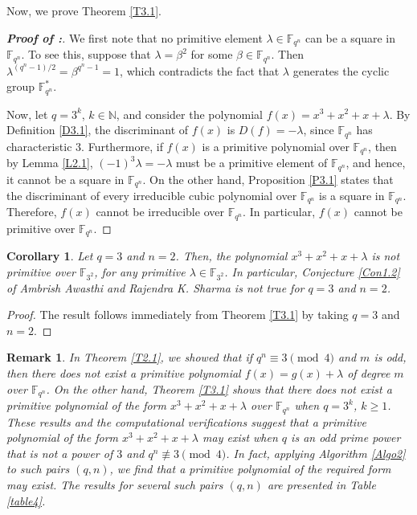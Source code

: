 \documentclass[preprint,12pt]{elsarticle}
\newtheorem{cor}{Corollary}[section]
\newtheorem{rk}{Remark}[section]
\begin{document}
     Now, we prove Theorem \ref{T3.1}.
    \begin{proof}[\textbf{Proof of :}]
        We first note that no primitive element $\lambda\in\mathbb{F}_{q^n}$ can be a square in $\mathbb{F}_{q^n}$. To see this, suppose that $\lambda=\beta^2$ for some $\beta\in\mathbb{F}_{q^n}$. Then $\lambda^{(q^n-1)/2}=\beta^{q^n-1}=1$, which contradicts the fact that $\lambda$ generates the cyclic group $\mathbb{F}_{q^n}^{*}$.

        Now, let $q=3^k$, $k\in\mathbb{N}$, and consider the polynomial $f(x)=x^3+x^2+x+\lambda$. By Definition \ref{D3.1}, the discriminant of $f(x)$ is $D(f)=-\lambda$, since $\mathbb{F}_{q^n}$ has characteristic $3$. Furthermore, if $f(x)$ is a primitive polynomial over $\mathbb{F}_{q^n}$, then by Lemma \ref{L2.1}, $(-1)^3\lambda=-\lambda$ must be a primitive element of $\mathbb{F}_{q^n}$, and hence, it cannot be a square in $\mathbb{F}_{q^n}$. On the other hand, Proposition \ref{P3.1} states that the discriminant of every irreducible cubic polynomial over $\mathbb{F}_{q^n}$ is a square in $\mathbb{F}_{q^n}$. Therefore, $f(x)$ cannot be irreducible over $\mathbb{F}_{q^n}$. In particular, $f(x)$ cannot be primitive over $\mathbb{F}_{q^n}$.
    \end{proof}

    \begin{cor}\label{Cor3.1}
        Let $q=3$ and $n=2$. Then, the polynomial $x^3+x^2+x+\lambda$ is not primitive over $\mathbb{F}_{3^2}$, for any primitive $\lambda\in\mathbb{F}_{3^2}$. In particular, {\upshape Conjecture \ref{Con1.2}} of Ambrish Awasthi and Rajendra K. Sharma is not true for $q=3$ and $n=2$.
    \end{cor}
    \begin{proof}
        The result follows immediately from Theorem \ref{T3.1} by taking $q=3$ and $n=2$.
    \end{proof}

    \begin{rk}\label{R3.1}
        In {\upshape Theorem \ref{T2.1}}, we showed that if $q^n\equiv 3\pmod 4$ and $m$ is odd, then there does not exist a primitive polynomial $f(x)=g(x)+\lambda$ of degree $m$ over $\mathbb{F}_{q^n}$. On the other hand, {\upshape Theorem \ref{T3.1}} shows that there does not exist a primitive polynomial of the form $x^3+x^2+x+\lambda$ over $\mathbb{F}_{q^n}$ when $q=3^k$, $k\geq 1$. These results and the computational verifications suggest that a primitive polynomial of the form $x^3+x^2+x+\lambda$ may exist when $q$ is an odd prime power that is not a power of $3$ and $q^n\not\equiv 3\pmod 4$. In fact, applying {\upshape Algorithm \ref{Algo2}} to such pairs $(q,n)$, we find that a primitive polynomial of the required form may exist. The results for several such pairs $(q,n)$ are presented in {\upshape Table \ref{table4}}.    
    \end{rk}
\end{document}
